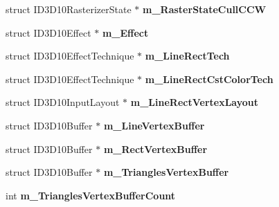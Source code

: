 \begin{DoxyCompactItemize}
\item 
\hypertarget{class_c_tw_graph_direct3_d10_a9e17830649ed09a4bc953be73bd57ae7}{struct I\+D3\+D10\+Rasterizer\+State $\ast$ {\bfseries m\+\_\+\+Raster\+State\+Cull\+C\+C\+W}}\label{class_c_tw_graph_direct3_d10_a9e17830649ed09a4bc953be73bd57ae7}

\item 
\hypertarget{class_c_tw_graph_direct3_d10_a60aa0a6843d4e17b8c5e8d0502b658ea}{struct I\+D3\+D10\+Effect $\ast$ {\bfseries m\+\_\+\+Effect}}\label{class_c_tw_graph_direct3_d10_a60aa0a6843d4e17b8c5e8d0502b658ea}

\item 
\hypertarget{class_c_tw_graph_direct3_d10_a765ac0541d1a0e1c9af700ae3c7680fb}{struct I\+D3\+D10\+Effect\+Technique $\ast$ {\bfseries m\+\_\+\+Line\+Rect\+Tech}}\label{class_c_tw_graph_direct3_d10_a765ac0541d1a0e1c9af700ae3c7680fb}

\item 
\hypertarget{class_c_tw_graph_direct3_d10_a8abd90fea7cec6c8098deb0297dee792}{struct I\+D3\+D10\+Effect\+Technique $\ast$ {\bfseries m\+\_\+\+Line\+Rect\+Cst\+Color\+Tech}}\label{class_c_tw_graph_direct3_d10_a8abd90fea7cec6c8098deb0297dee792}

\item 
\hypertarget{class_c_tw_graph_direct3_d10_aacf439197fae10adf0c21ec2156a9479}{struct I\+D3\+D10\+Input\+Layout $\ast$ {\bfseries m\+\_\+\+Line\+Rect\+Vertex\+Layout}}\label{class_c_tw_graph_direct3_d10_aacf439197fae10adf0c21ec2156a9479}

\item 
\hypertarget{class_c_tw_graph_direct3_d10_ae2bb5f33db04b70d85331baecf8b9c55}{struct I\+D3\+D10\+Buffer $\ast$ {\bfseries m\+\_\+\+Line\+Vertex\+Buffer}}\label{class_c_tw_graph_direct3_d10_ae2bb5f33db04b70d85331baecf8b9c55}

\item 
\hypertarget{class_c_tw_graph_direct3_d10_a2d683ecc99b3654ab42d10749ab4f305}{struct I\+D3\+D10\+Buffer $\ast$ {\bfseries m\+\_\+\+Rect\+Vertex\+Buffer}}\label{class_c_tw_graph_direct3_d10_a2d683ecc99b3654ab42d10749ab4f305}

\item 
\hypertarget{class_c_tw_graph_direct3_d10_a6b0f32c162e9b9fe947a5bbaf6f906e0}{struct I\+D3\+D10\+Buffer $\ast$ {\bfseries m\+\_\+\+Triangles\+Vertex\+Buffer}}\label{class_c_tw_graph_direct3_d10_a6b0f32c162e9b9fe947a5bbaf6f906e0}

\item 
\hypertarget{class_c_tw_graph_direct3_d10_ab2a59c7850929b5d4697441595bfc858}{int {\bfseries m\+\_\+\+Triangles\+Vertex\+Buffer\+Count}}\label{class_c_tw_graph_direct3_d10_ab2a59c7850929b5d4697441595bfc858}


\end{DoxyCompactItemize}
